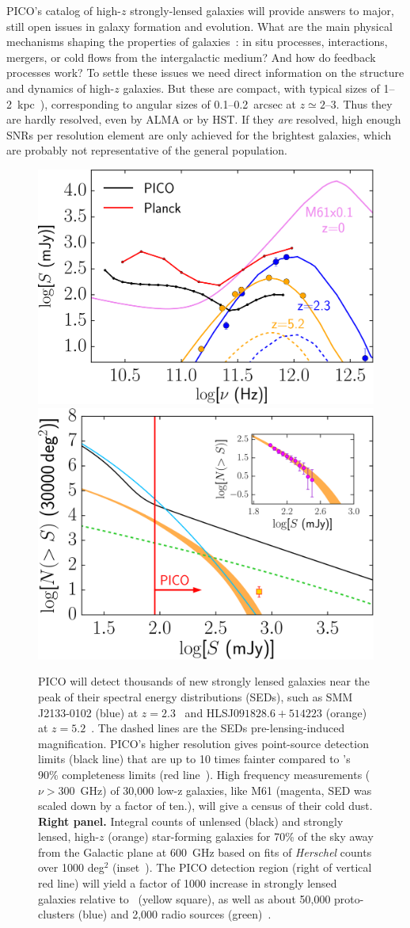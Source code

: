 \documentclass[PICOReport.tex]{subfiles}
\begin{document}
PICO's catalog of high-$z$ strongly-lensed galaxies will provide answers to major, still open issues in galaxy formation and evolution. What are the main physical mechanisms shaping the properties of galaxies~\citep{SilkMamon2012, SomervilleDave2015}: in situ processes, interactions, mergers, or cold flows  from the intergalactic medium? And how do feedback processes work? To settle these issues we need direct information on the structure and dynamics of high-$z$ galaxies. But these are compact, with typical sizes of 1--2~kpc~\cite{Fujimoto2018}), corresponding to angular sizes of 0.1--0.2~arcsec at $z\simeq 2$--3. Thus they are hardly resolved, even by ALMA or by HST. If they {\it are} resolved, high enough \ac{SNR}s per resolution element are only achieved for the brightest galaxies, which are probably not representative of the general population.
\begin{figure}[h]
\begin{center}
\includegraphics[width=0.416\columnwidth, trim={0 0 0 0cm}, clip]{images/fig_SED_PICO.pdf}
\hspace{0.75cm}
\includegraphics[width=0.4\columnwidth, trim={0 0 0 0cm}, clip]{images/NgtF_pico_NEWNEW.pdf}
\vskip-0.3cm
\caption{  PICO will detect thousands of new strongly lensed galaxies near the peak of their spectral energy distributions (SEDs), such as SMM\,J2133-0102 (blue)  at $z=2.3$~\cite{Swinbank2010} and HLSJ$091828.6{+}514223$ (orange) at $z=5.2$~\cite{Combes2012}. The dashed lines are the SEDs pre-lensing-induced magnification. PICO's higher resolution gives point-source detection limits (black line) that are up to 10 times fainter compared to \planck 's 90\% completeness limits (red line~\cite{PCCS2}). High frequency measurements ($\nu>300$~GHz) of 30,000 low-z galaxies, like M61 (magenta, SED was scaled down by a factor of ten.), will give a census of their cold dust.  {\bf Right panel.} Integral counts of unlensed (black) and strongly lensed, high-$z$ (orange) star-forming galaxies for 70\% of the sky away from the Galactic plane at 600~GHz based on fits of \textit{Herschel} counts over 1000 deg$^2$ (inset~\citep{Negrello2017lensed}). The PICO detection region (right of vertical red line) will yield a factor of 1000 increase in strongly lensed galaxies relative to \planck~(yellow square), as well as about 50,000 proto-clusters (blue) and 2,000 radio sources (green)~\citep{Negrello2017protocl}. }

\end{center}
\end{figure}
\end{document}
